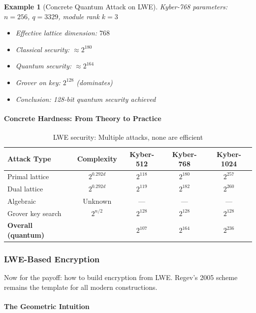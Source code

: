 \documentclass[11pt,a4paper]{article}
\newtheorem{example}{Example}
\begin{document}
\begin{example}[Concrete Quantum Attack on LWE]
Kyber-768 parameters: $n = 256$, $q = 3329$, module rank $k = 3$
\begin{itemize}
    \item Effective lattice dimension: $768$
    \item Classical security: $\approx 2^{180}$
    \item Quantum security: $\approx 2^{164}$
    \item Grover on key: $2^{128}$ (dominates)
    \item Conclusion: 128-bit quantum security achieved
\end{itemize}
\end{example}

\paragraph{Concrete Hardness: From Theory to Practice}

\begin{table}[h]
\centering
\begin{tabular}{|l|c|c|c|c|}
\hline
\textbf{Attack Type} & \textbf{Complexity} & \textbf{Kyber-512} & \textbf{Kyber-768} & \textbf{Kyber-1024} \\
\hline
Primal lattice & $2^{0.292d}$ & $2^{118}$ & $2^{180}$ & $2^{257}$ \\
Dual lattice & $2^{0.292d}$ & $2^{119}$ & $2^{182}$ & $2^{260}$ \\
Algebraic & Unknown & — & — & — \\
Grover key search & $2^{n/2}$ & $2^{128}$ & $2^{128}$ & $2^{128}$ \\
\hline
\textbf{Overall (quantum)} & & \textbf{$2^{107}$} & \textbf{$2^{164}$} & \textbf{$2^{236}$} \\
\hline
\end{tabular}
\caption{LWE security: Multiple attacks, none are efficient}
\end{table}

\subsubsection{LWE-Based Encryption}

Now for the payoff: how to build encryption from LWE. Regev's 2005 scheme remains the template for all modern constructions.

\paragraph{The Geometric Intuition}
\end{document}
